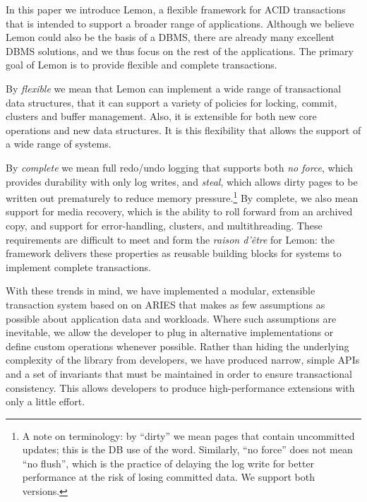 \documentclass[10pt,letterpaper,twocolumn,english]{article}
\newcommand{\yad}{Lemon\xspace}
\begin{document}
In this paper we introduce \yad, a flexible framework for ACID
transactions that is intended to support a broader range of
applications.  Although we believe \yad could also be the basis of a
DBMS, there are already many excellent DBMS solutions, and we thus
focus on the rest of the applications.  The primary goal of \yad is to
provide flexible and complete transactions.

By {\em flexible} we mean that \yad can implement a wide range of
transactional data structures, that it can support a variety of
policies for locking, commit, clusters and buffer management. Also,
it is extensible for both new core operations and new data
structures.  It is this flexibility that allows the support of a wide
range of systems.

By {\em complete} we mean full redo/undo logging that supports both
{\em no force}, which provides durability with only log writes, and
{\em steal}, which allows dirty pages to be written out prematurely to
reduce memory pressure.\footnote{A note on terminology: by ``dirty''
we mean pages that contain uncommitted updates; this is the DB use of
the word. Similarly, ``no force'' does not mean ``no flush'', which is
the practice of delaying the log write for better performance at the
risk of losing committed data. We support both versions.} By complete,
we also mean support for media recovery, which is the ability to roll
forward from an archived copy, and support for error-handling,
clusters, and multithreading.  These requirements are difficult to
meet and form the {\em raison d'\^{e}tre} for \yad: the framework delivers
these properties as reusable building blocks for systems to implement 
complete transactions.

With these trends in mind, we have implemented a modular, extensible
transaction system based on on ARIES that makes as few assumptions as
possible about application data and workloads. Where such
assumptions are inevitable, we allow 
the developer to plug in alternative implementations or
define custom operations whenever possible. Rather than hiding the underlying complexity
of the library from developers, we have produced narrow, simple APIs
and a set of invariants that must be maintained in order to ensure
transactional consistency.  This allows developers to produce
high-performance extensions with only a little effort.  
\end{document}
